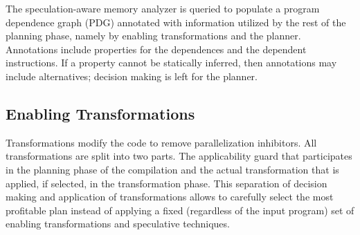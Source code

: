 
The speculation-aware memory analyzer is queried to populate a program
dependence graph (PDG) annotated with information utilized by the rest
of the planning phase, namely by enabling transformations and the
planner. Annotations include properties for the dependences and the
dependent instructions.
If a property cannot be statically inferred, then annotations may
include alternatives; decision making is left for the planner.


\subsection{Enabling Transformations}
\label{enablers}

Transformations modify the code to remove parallelization inhibitors.
%
All transformations are split into two parts. The applicability guard
that participates in the planning phase of the compilation and the
actual transformation that is applied, if selected, in the
transformation phase.
This separation of decision making and application of transformations
allows \name to carefully select the most profitable plan instead of
applying a fixed (regardless of the input program) set of enabling
transformations and speculative techniques.

